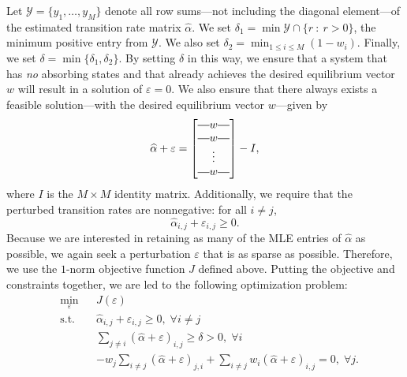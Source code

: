 \documentclass[review,letterpaper,11pt]{elsarticle}
\newcommand*{\horzbar}{\rule[.5ex]{2.5ex}{0.5pt}}
\begin{document}
Let $\mathcal{Y} = \{y_1, \ldots, y_{M}\}$ denote all row sums---not including the diagonal element---of the estimated transition rate matrix $\widehat{\alpha}$.  We set $\delta_1 = \min \mathcal{Y} \cap \{ r \ : \ r > 0 \}$, the minimum positive entry from $\mathcal{Y}$.  We also set $\delta_2 = \min_{1 \leq i \leq M} (1 - w_i)$.  Finally, we set $\delta = \min \{\delta_1, \delta_2\}$.  By setting $\delta$ in this way, we ensure that a system that has \emph{no} absorbing states and that already achieves the desired equilibrium vector $w$ will result in a solution of $\varepsilon = 0$.  We also ensure that there always exists a feasible solution---with the desired equilibrium vector $w$---given by
\begin{equation}
\label{eqn:ctmcguarantee}
\widehat{\alpha} + \varepsilon = 
\begin{bmatrix} \horzbar w \horzbar \\
\horzbar w \horzbar \\
\vdots \\
\horzbar w \horzbar
\end{bmatrix} - I,
\end{equation}
where $I$ is the $M \times M$ identity matrix.  Additionally, we require that the perturbed transition rates are nonnegative: for all $i \neq j$,
$$
\widehat{\alpha}_{i,j} + \varepsilon_{i,j} \geq 0.
$$
Because we are interested in retaining as many of the MLE entries of $\widehat{\alpha}$ as possible, we again seek a perturbation $\varepsilon$ that is as sparse as possible.  Therefore, we use the $1$-norm objective function $J$ defined above.  Putting the objective and constraints together, we are led to the following optimization problem:
\begin{equation}
\label{eqn:ctmcopt1}
\begin{aligned}
& \underset{\varepsilon}{\text{min}} && J(\varepsilon) \\
& \text{s.t.}
&& \widehat{\alpha}_{i,j} + \varepsilon_{i,j} \geq 0, \;  \forall i \neq j \\
&&& \sum_{j \neq i} (\widehat{\alpha} + \varepsilon)_{i,j} \geq \delta > 0, \; \forall i \\
&&& -w_j \sum_{i \neq j} (\widehat{\alpha} + \varepsilon)_{j,i} + \sum_{i \neq j } w_i (\widehat{\alpha} + \varepsilon)_{i,j} = 0, \;  \forall j.
\end{aligned}
\end{equation}
\end{document}
